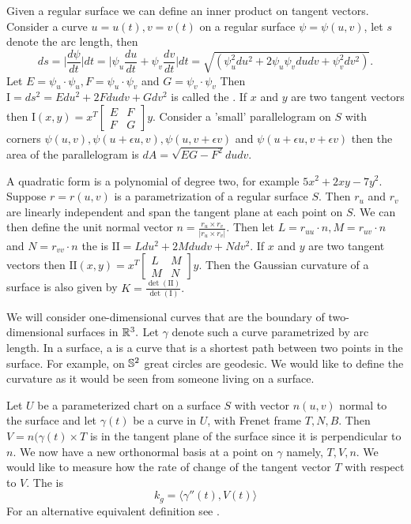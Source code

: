 Given a regular surface we can define an inner product on tangent vectors.
Consider a curve $u=u(t), v=v(t)$ on a regular surface $\psi=\psi(u,v)$, let
$s$ denote the arc length, then 
$$ds=\bigg | \frac{d\psi}{dt}\bigg | dt = \bigg | \psi_u\frac{du}{dt}+\psi_v\frac{dv}{dt}\bigg |dt
=\sqrt{(\psi_u^2 du^2+2\psi_u\psi_v du dv + \psi_v^2dv^2)}.$$
Let $E=\psi_u\cdot \psi_u, F=\psi_u\cdot \psi_v$ and  $G=\psi_v\cdot \psi_v$
Then $\mathrm{I}=ds^2=Edu^2+2Fdudv +Gdv^2$ is called the .
If $x$ and $y$ are two tangent vectors
then $\mathrm{I}(x,y)=x^T\begin{bmatrix}
E & F \\
F & G 
\end{bmatrix}y.$
Consider a 'small' parallelogram on $S$ with corners $\psi(u,v),\psi(u+\epsilon u, v), \psi(u,v+\epsilon v)$ 
and $\psi(u+\epsilon u, v+\epsilon v)$ then the area of the parallelogram is
$dA=\sqrt{EG-F^2}dudv.$


A quadratic form is a polynomial of degree two, for example $5x^2+2xy-7y^2$.
Suppose $r=r(u,v)$ is a parametrization of a regular surface $S$.
Then $r_u$ and $r_v$ are linearly independent and span the tangent plane at each point
on $S$. We can then define the unit normal vector $n=\frac{r_u\times r_v}{|r_u\times r_v|}$.
Then let $L=r_{uu}\cdot n, M=r_{uv}\cdot n$ and $N=r_{vv}\cdot n$ the
 is $\mathrm{I\!I}=Ldu^2+2Mdudv+Ndv^2$.
If $x$ and $y$ are two tangent vectors
then $\mathrm{I\!I}(x,y)=x^T\begin{bmatrix}
L & M \\
M & N 
\end{bmatrix}y.$
Then the Gaussian curvature of a surface is also given by
$K=\frac{\det(\mathrm{I\!I})}{\det(\mathrm{I})}.$



We will consider one-dimensional curves that are the boundary of two-dimensional
surfaces in $\mathbb{R}^3.$ Let $\gamma$ denote such a curve parametrized by arc length.
In a surface, a  is a curve that is a shortest path
between two points in the surface. 
For example, on $\mathbb{S}^2$ great circles are geodesic.
We would like to define the curvature as it would be seen from
someone living on a surface.

Let $U$ be a parameterized chart on a surface $S$ with vector $n(u,v)$ normal
to the surface
and let $\gamma(t)$ be a curve in $U$, with Frenet frame $T,N,B$.
Then $V=n(\gamma(t)\times T$ is in the tangent plane of the surface since
it is perpendicular to $n$. We now have a new orthonormal basis at a point on $\gamma$
namely, $T,V,n$. 
We would like to measure how the rate of change of the tangent vector $T$ with respect to $V$.
The  is  
\begin{equation} \label{eqn:geodesic}
	k_g=\langle \gamma''(t),V(t)\rangle
\end{equation}
For an alternative equivalent definition see \cite{doc76}.



